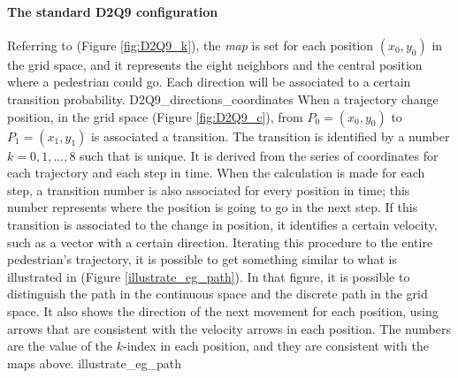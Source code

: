 \documentclass[class=article, crop=false]{standalone}
\begin{document}
\paragraph{The standard D2Q9 configuration}
Referring to (Figure \ref{fig:D2Q9_k}), the \emph{map} is set for each position $(x_0, y_0)$ in the grid space, and it represents the eight neighbors and the central position where a pedestrian could go. 
Each direction will be associated to a certain transition probability. 
	{D2Q9_directions_coordinates}
When a trajectory change position, in the grid space (Figure \ref{fig:D2Q9_c}), from $P_0=(x_0, y_0)$ to $P_1=(x_1, y_1)$ is associated a transition. 
The transition is identified by a number $k = 0,1,...,8$ such that is unique. 
It is derived from the series of coordinates for each trajectory and each step in time. 
When the calculation is made for each step, a transition number is also associated for every position in time; this number represents where the position is going to go in the next step.
If this transition is associated to the change in position, it identifies a certain velocity, such as a vector with a certain direction. 
Iterating this procedure to the entire pedestrian’s trajectory, it is possible to get something similar to what is illustrated in (Figure \ref{illustrate_eg_path}). 
In that figure, it is possible to distinguish the path in the continuous space and the discrete path in the grid space. 
It also shows the direction of the next movement for each position, using arrows that are consistent with the velocity arrows in each position. 
The numbers are the value of the $k$-index in each position, and they are consistent with the maps above. 
	{illustrate_eg_path}
\end{document}
